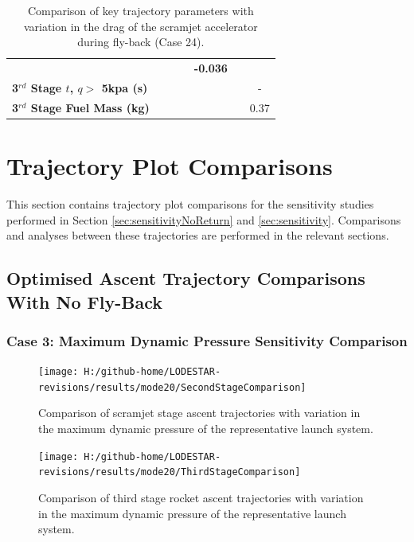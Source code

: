 \begin{table}[!ht]
\begin{tabular}{l c c c c c c}
		& \textbf{\thirddExergyEffCdReturnStandard}
		& \textbf{\thirddExergyEffCdReturnOneHundredFive}
		& \textbf{\thirddExergyEffCdReturnOneHundredTen}
		& \textbf{-0.036}
		\\
		\textbf{3$^{rd}$ Stage $t$, $q >$ 5kpa (s)}
		& \thirdqOverFiveCdReturnNinety
		& \thirdqOverFiveCdReturnNinetyFive
		& \thirdqOverFiveCdReturnStandard
		& \thirdqOverFiveCdReturnOneHundredFive
		& \thirdqOverFiveCdReturnOneHundredTen
		& -
		\\
		\textbf{3$^{rd}$ Stage Fuel Mass (kg)}
		& \thirdmFuelCdReturnNinety
		& \thirdmFuelCdReturnNinetyFive
		& \thirdmFuelCdReturnStandard
		& \thirdmFuelCdReturnOneHundredFive
		& \thirdmFuelCdReturnOneHundredTen
		&0.37
		
	\end{tabular}
	\caption{Comparison of key trajectory parameters with variation in the drag of the scramjet accelerator during fly-back (Case 24).}
	\label{tab:returndragvar}
\end{table}
\FloatBarrier



		
		\chapter{Trajectory Plot Comparisons}\label{sec:Appendix_trajectorycomparisons}
This section contains trajectory plot comparisons for the sensitivity studies performed in Section \ref{sec:sensitivityNoReturn} and \ref{sec:sensitivity}. Comparisons and analyses between these trajectories are performed in the relevant sections. 
		\clearpage
		\section{Optimised Ascent Trajectory Comparisons With No Fly-Back}
		\subsection{Case 3: Maximum Dynamic Pressure Sensitivity Comparison}\label{sec:app_comparison20}
\begin{figure}[!ht]
\centering
\texttt{[image: H:/github-home/LODESTAR-revisions/results/mode20/SecondStageComparison]}
\caption{Comparison of scramjet stage ascent trajectories with variation in the maximum dynamic pressure of the representative launch system.}
\label{fig:SecondStageComparison1}
\end{figure}
\begin{figure}[!th]
\centering
\texttt{[image: H:/github-home/LODESTAR-revisions/results/mode20/ThirdStageComparison]}
\caption{Comparison of third stage rocket ascent trajectories with variation in the maximum dynamic pressure of the representative launch system.}
\label{fig:ThirdStageComparison1}
\end{figure}
\FloatBarrier
\clearpage

